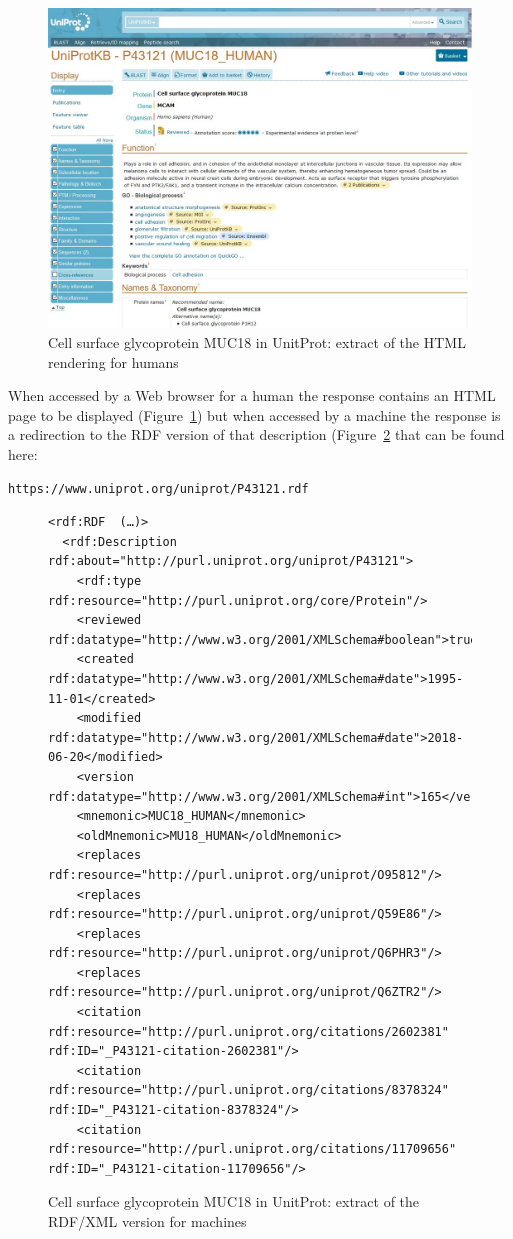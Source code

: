 \begin{figure}
    \centering
    \includegraphics[width=5.0in]{media/figure-05-05.jpg}
    \caption{Cell surface glycoprotein MUC18 in UnitProt: extract of the HTML
rendering for humans}
    \label{fig:ch5.5}
\end{figure}

When accessed by a Web browser for a human the response contains an HTML
page to be displayed (Figure~\ref{fig:ch5.5}) but when accessed by a machine the
response is a redirection to the RDF version of that description (Figure~\ref{fig:ch5.6} that can be found here:

\begin{lstlisting}
https://www.uniprot.org/uniprot/P43121.rdf
\end{lstlisting}



\begin{figure}
\begin{lstlisting}
<rdf:RDF  (…)>
  <rdf:Description rdf:about="http://purl.uniprot.org/uniprot/P43121">
    <rdf:type rdf:resource="http://purl.uniprot.org/core/Protein"/>
    <reviewed rdf:datatype="http://www.w3.org/2001/XMLSchema#boolean">true</reviewed>
    <created rdf:datatype="http://www.w3.org/2001/XMLSchema#date">1995-11-01</created>
    <modified rdf:datatype="http://www.w3.org/2001/XMLSchema#date">2018-06-20</modified>
    <version rdf:datatype="http://www.w3.org/2001/XMLSchema#int">165</version>
    <mnemonic>MUC18_HUMAN</mnemonic>
    <oldMnemonic>MU18_HUMAN</oldMnemonic>
    <replaces rdf:resource="http://purl.uniprot.org/uniprot/O95812"/>
    <replaces rdf:resource="http://purl.uniprot.org/uniprot/Q59E86"/>
    <replaces rdf:resource="http://purl.uniprot.org/uniprot/Q6PHR3"/>
    <replaces rdf:resource="http://purl.uniprot.org/uniprot/Q6ZTR2"/>
    <citation rdf:resource="http://purl.uniprot.org/citations/2602381" rdf:ID="_P43121-citation-2602381"/>
    <citation rdf:resource="http://purl.uniprot.org/citations/8378324" rdf:ID="_P43121-citation-8378324"/>
    <citation rdf:resource="http://purl.uniprot.org/citations/11709656" rdf:ID="_P43121-citation-11709656"/>
\end{lstlisting}
    \caption{Cell surface glycoprotein MUC18 in UnitProt: extract of the
RDF/XML version for machines}
    \label{fig:ch5.6}
\end{figure}

